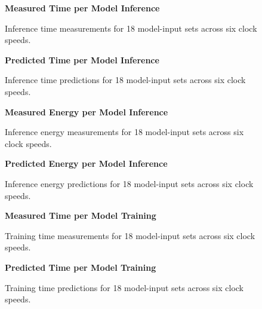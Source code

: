 \begin{figure}[htbp]
    \centering
    \parbox{1.1\textwidth}{\centering\textbf{Measured Time per Model Inference}}
    \caption{Inference time measurements for 18 model-input sets across six clock speeds.}
    \label{fig:grpfmtimeinf}
    \vspace{0.2cm}
    \parbox{1.1\textwidth}{\centering\textbf{Predicted Time per Model Inference}}
    \caption{Inference time predictions for 18 model-input sets across six clock speeds.}
    \label{fig:gprpredtimeinf}
\end{figure}


\begin{figure}[htbp]
    \centering
    \parbox{1.1\textwidth}{\centering\textbf{Measured Energy per Model Inference}}
    \caption{Inference energy measurements for 18 model-input sets across six clock speeds.}
    \label{fig:grpfmenergyinf}
    \vspace{0.2cm}
    \parbox{1.1\textwidth}{\centering\textbf{Predicted Energy per Model Inference}}
    \caption{Inference energy predictions for 18 model-input sets across six clock speeds.}
    \label{fig:fprpredenergyinf}
\end{figure}


\begin{figure}[htbp]
    \centering
    \parbox{1.1\textwidth}{\centering\textbf{Measured Time per Model Training}}
    \caption{Training time measurements for 18 model-input sets across six clock speeds.}
    \label{fig:grpfmtimetrain}
    \vspace{0.2cm}
    \parbox{1.1\textwidth}{\centering\textbf{Predicted Time per Model Training}}
    \caption{Training time predictions for 18 model-input sets across six clock speeds.}
    \label{fig:grppredtimetrain}
\end{figure}


